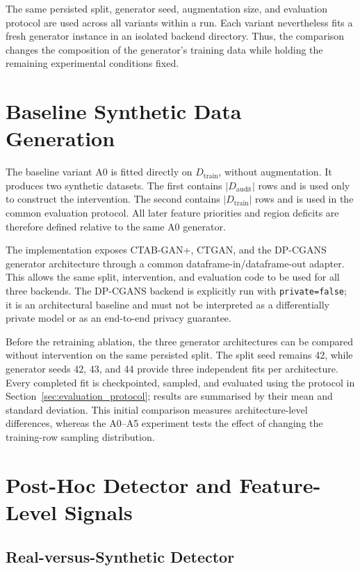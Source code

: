 The same persisted split, generator seed, augmentation size, and evaluation
protocol are used across all variants within a run. Each variant nevertheless
fits a fresh generator instance in an isolated backend directory. Thus, the
comparison changes the composition of the generator's training data while
holding the remaining experimental conditions fixed.

\section{Baseline Synthetic Data Generation}
\label{sec:baseline_generation}

The baseline variant A0 is fitted directly on $D_{\mathrm{train}}$, without
augmentation. It produces two synthetic datasets. The first contains
$|D_{\mathrm{audit}}|$ rows and is used only to construct the intervention. The
second contains $|D_{\mathrm{train}}|$ rows and is used in the common evaluation
protocol. All later feature priorities and region deficits are therefore
defined relative to the same A0 generator.

The implementation exposes CTAB-GAN+, CTGAN, and the DP-CGANS generator
architecture through a common dataframe-in/dataframe-out adapter. This allows
the same split, intervention, and evaluation code to be used for all three
backends. The DP-CGANS backend is explicitly run with
\texttt{private=false}; it is an architectural baseline and must not be
interpreted as a differentially private model or as an end-to-end privacy
guarantee.

Before the retraining ablation, the three generator architectures can be
compared without intervention on the same persisted split. The split seed
remains 42, while generator seeds 42, 43, and 44 provide three independent
fits per architecture. Every completed fit is checkpointed, sampled, and
evaluated using the protocol in Section~\ref{sec:evaluation_protocol}; results
are summarised by their mean and standard deviation. This initial comparison
measures architecture-level differences, whereas the A0--A5 experiment tests
the effect of changing the training-row sampling distribution.

\section{Post-Hoc Detector and Feature-Level Signals}
\label{sec:feature_signals}

\subsection{Real-versus-Synthetic Detector}

